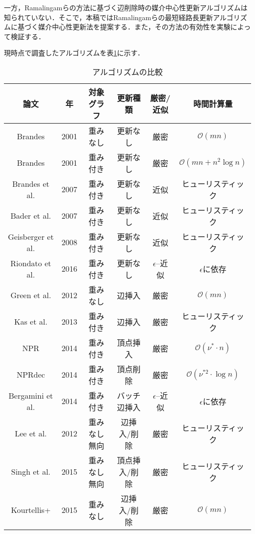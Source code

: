 一方，Ramalingamらの方法に基づく辺削除時の媒介中心性更新アルゴリズムは知られていない．そこで，本稿ではRamalingamらの最短経路長更新アルゴリズムに基づく媒介中心性更新法を提案する．また，その方法の有効性を実験によって検証する．

現時点で調査したアルゴリズムを表\ref{tab:related-algorithms}に示す．

\begin{table}
  \label{tab:related-algorithms}
  \centering
  \caption{アルゴリズムの比較}
  \begin{tabular}{cccccc}
    \hline
    論文 & 年 & 対象グラフ & 更新種類 & 厳密/近似 & 時間計算量 \\ \hline
    Brandes\cite{Brandes2001} & 2001 & 重みなし & 更新なし & 厳密 & $\mathcal{O}(mn)$ \\ \hline
    Brandes\cite{Brandes2001} & 2001 & 重み付き & 更新なし & 厳密 & $\mathcal{O}(mn+n^2\log n)$ \\ \hline
    Brandes et al.\cite{Brandes2007} & 2007 & 重み付き & 更新なし & 近似 & ヒューリスティック \\ \hline
    Bader et al.\cite{Bader2007} & 2007 & 重み付き & 更新なし & 近似 & ヒューリスティック \\ \hline
    Geisberger et al.\cite{Geisberger2008} & 2008 & 重み付き & 更新なし & 近似 & ヒューリスティック \\ \hline
    Riondato et al.\cite{Riondato2016} & 2016 & 重み付き & 更新なし & $\epsilon$--近似 & $\epsilon$に依存 \\ \hline
    Green et al.\cite{Green2012} & 2012 & 重みなし & 辺挿入 & 厳密 & $\mathcal{O}(mn)$ \\ \hline
    Kas et al.\cite{Kas2013} & 2013 & 重み付き & 辺挿入 & 厳密 & ヒューリスティック \\ \hline
    NPR\cite{Nasre2014a} & 2014 & 重み付き & 頂点挿入 & 厳密 & $\mathcal{O}(\nu^\ast\cdot n)$ \\ \hline
    NPRdec\cite{Nasre2014b} & 2014 & 重み付き & 頂点削除 & 厳密 & $\mathcal{O}(\nu^{\ast 2}\cdot\log n)$ \\ \hline
    Bergamini et al.\cite{Bergamini2015a} & 2014 & 重み付き & バッチ辺挿入 & $\epsilon$--近似 & $\epsilon$に依存 \\ \hline
    Lee et al.\cite{Lee2012} & 2012 & 重みなし無向 & 辺挿入/削除 & 厳密 & ヒューリスティック \\ \hline
    Singh et al.\cite{Singh2015} & 2015 & 重みなし無向 & 頂点挿入/削除 & 厳密 & ヒューリスティック \\ \hline
    Kourtellis+\cite{Kourtellis2015} & 2015 & 重みなし & 辺挿入/削除 & 厳密 & $\mathcal{O}(mn)$ \\ \hline

\end{tabular}
\end{table}
